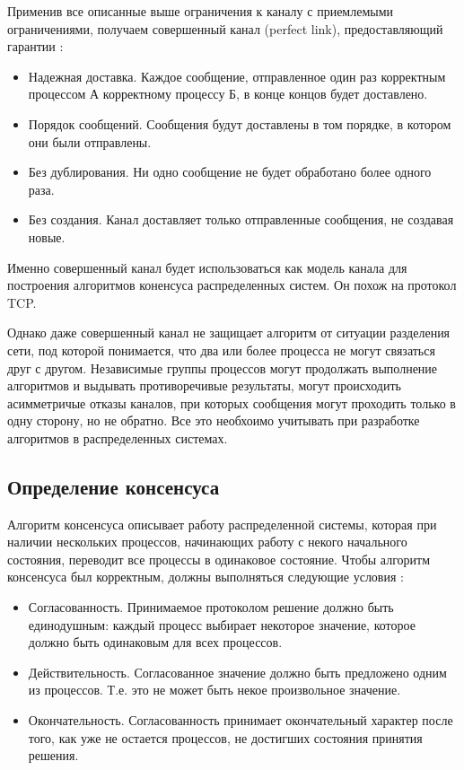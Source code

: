 Применив все описанные выше ограничения к каналу с приемлемыми ограничениями,
получаем совершенный канал (perfect link), предоставляющий гарантии \cite{cachin11}:

\begin{itemize}
    \item Надежная доставка. Каждое сообщение, отправленное один раз корректным
        процессом А корректному процессу Б, в конце концов будет доставлено.
    \item Порядок сообщений. Сообщения будут доставлены в том порядке, в котором
        они были отправлены.
    \item Без дублирования. Ни одно сообщение не будет обработано более одного раза.
    \item Без создания. Канал доставляет только отправленные сообщения, не создавая
        новые.
\end{itemize}

Именно совершенный канал будет использоваться как модель канала для построения
алгоритмов коненсуса распределенных систем. Он похож на протокол TCP.

Однако даже совершенный канал не защищает алгоритм от ситуации разделения сети,
под которой понимается, что два или более процесса не могут связаться друг
с другом. Независимые группы процессов могут продолжать выполнение алгоритмов
и выдывать противоречивые результаты, могут происходить асимметричые отказы
каналов, при которых сообщения могут проходить только в одну сторону, но не
обратно. Все это необхоимо учитывать при разработке алгоритмов в распределенных
системах.

\subsection{Определение консенсуса}

Алгоритм консенсуса описывает работу распределенной системы, которая при наличии
нескольких процессов, начинающих работу с некого начального состояния, переводит
все процессы в одинаковое состояние. Чтобы алгоритм консенсуса был корректным,
должны выполняться следующие условия \cite{petrov}:

\begin{itemize}
    \item Согласованность. Принимаемое протоколом решение должно быть единодушным:
        каждый процесс  выбирает некоторое значение, которое должно быть
        одинаковым для всех процессов.
    \item Действительность. Согласованное значение должно быть предложено одним
        из процессов. Т.е. это не может быть некое произвольное значение.
    \item Окончательность. Согласованность принимает окончательный характер после
        того, как уже не остается процессов, не достигших состояния принятия решения.
\end{itemize}

